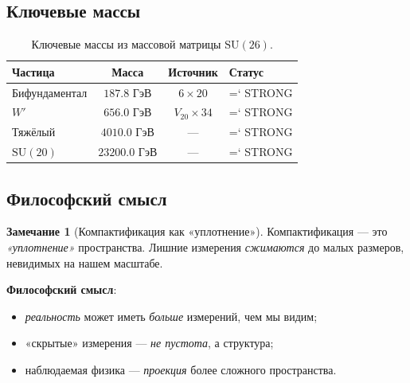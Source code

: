 \documentclass[11pt,a4paper]{article}
\newcommand{\SU}{\mathrm{SU}}
\renewcommand{\texttt}[1]{{\ttfamily\hyphenchar\font=`\- #1}}
\theoremstyle{definition}
\newtheorem{remark}[theorem]{Замечание}
\begin{document}
\subsection{Ключевые массы}
\label{subsec:key-masses}

\begin{table}[htbp]
\centering
\caption{Ключевые массы из массовой матрицы $\SU(26)$.}
\label{tab:key-masses}
\begin{tabular}{lccl}
\toprule
Частица & Масса & Источник & Статус \\ 
\midrule
Бифундаментал & $187.8$ ГэВ & $6 \times 20$ & \texttt{STRONG} \\[0.3em]
$W'$ & $656.0$ ГэВ & $V_{20} \times 34$ & \texttt{STRONG} \\[0.3em]
Тяжёлый & $4010.0$ ГэВ & --- & \texttt{STRONG} \\[0.3em]
$\SU(20)$ & $23200.0$ ГэВ & --- & \texttt{STRONG} \\ 
\bottomrule
\end{tabular}
\end{table}

\subsection{Философский смысл}
\label{subsec:comp-philosophy}

\begin{remark}[Компактификация как «уплотнение»]
\label{rem:compactification-philosophy}
Компактификация — это \emph{«уплотнение»} пространства. 
Лишние измерения \emph{сжимаются} до малых размеров, 
невидимых на нашем масштабе.

\medskip\noindent
\textbf{Философский смысл}: 
\begin{itemize}
    \item \emph{реальность} может иметь \emph{больше} измерений, 
          чем мы видим;
    \item «скрытые» измерения — \emph{не пустота}, 
          а структура;
    \item наблюдаемая физика — \emph{проекция} 
          более сложного пространства.
\end{itemize}
\end{remark}
\end{document}
